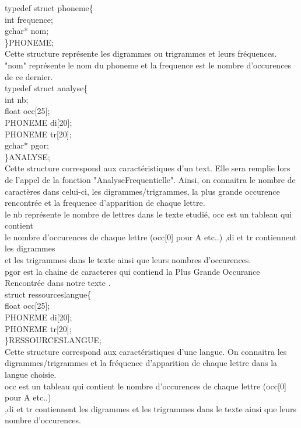 \documentclass[a4]{article}
\begin{document}
		
		
	typedef struct phoneme\{\\
		int frequence;\\
		gchar* nom;\\
	\}PHONEME;\\
	Cette structure représente les digrammes ou trigrammes et leurs fréquences.\\
	"nom" représente le nom du phoneme et la frequence est le nombre d'occurences\\
	de ce dernier.\\
	
	typedef struct analyse\{ \\
		int nb; \\
		float occ[25];\\
		PHONEME di[20];\\
		PHONEME tr[20];\\
		gchar* pgor;\\
	\}ANALYSE;\\
	Cette structure correspond aux caractéristiques d'un text. Elle sera remplie lors de
	l'appel de la fonction "AnalyseFrequentielle". Ainsi, on connaitra
	le nombre de caractères dans celui-ci, les digrammes/trigrammes, la plus grande occurence
	rencontrée et la frequence d'apparition de chaque lettre.\\
	le nb représente le nombre de lettres dans le texte etudié, occ est un tableau qui contient \\
	le nombre d'occurences de chaque lettre (occ[0] pour A etc..) ,di et tr contiennent les digrammes \\
	et les trigrammes dans le texte ainsi que leurs nombres d'occurences.\\
	pgor est la chaine de caracteres qui contiend la Plus Grande Occurance Rencontrée dans notre texte .\\
	
	
	struct ressourceslangue\{ \\
		float occ[25];\\
		PHONEME di[20];\\
		PHONEME tr[20];\\
	\}RESSOURCESLANGUE;\\
	Cette structure correspond aux caractéristiques d'une langue. On connaitra
	les digrammes/trigrammes et la fréquence d'apparition de chaque lettre dans la langue choisie.\\
	occ est un tableau qui contient le nombre d'occurences de chaque lettre (occ[0] pour A etc..) \\
	,di et tr contiennent les digrammes et les trigrammes dans le texte ainsi que leurs nombre d'occurences.
\end{document}
